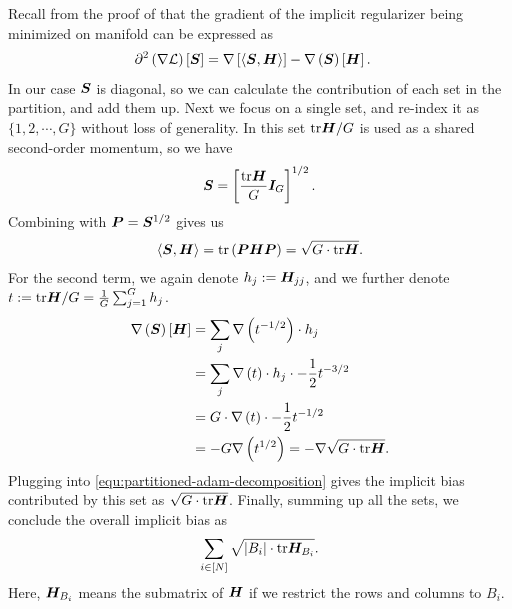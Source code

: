 Recall from the proof of  that the gradient of the implicit regularizer being minimized on manifold can be expressed as
\begin{align}
    \partial^2 \left(\nabla\mathcal{L}\right) \left[{\bm{S}}\right] &= \nabla\left[\langle {\bm{S}}, {\bm{H}}\rangle\right] - \nabla \left({\bm{S}}\right)\left[{\bm{H}}\right].\label{equ:partitioned-adam-decomposition}
\end{align}
In our case ${\bm{S}}$ is diagonal, so we can calculate the contribution of each set in the partition, and add them up. Next we focus on a single set, and re-index it as $\{1, 2, \cdots, G\}$ without loss of generality. In this set $\text{tr} {\bm{H}} / G$ is used as a shared second-order momentum, so we have \begin{align*}
    {\bm{S}} = \left[ \frac{\text{tr} {\bm{H}}}{G} {\bm{I}}_{G}\right]^{1/2}.
\end{align*}
Combining with ${\bm{P}} = {\bm{S}}^{1/2}$ gives us
\begin{align*}
    \langle {\bm{S}}, {\bm{H}}\rangle = \text{tr}\left({\bm{P}}{\bm{H}}{\bm{P}}\right) = \sqrt{G \cdot \text{tr} {\bm{H}}}.
\end{align*}
For the second term, we again denote $h_j:= {\bm{H}}_{jj}$, and we further denote $t:= \text{tr} {\bm{H}} / G = \frac{1}{G}\sum_{j = 1}^{G} h_j$. \begin{align*}
    \nabla \left({\bm{S}}\right)\left[{\bm{H}}\right] 
    &= \sum_j\nabla\left(t^{-1/2}\right) \cdot h_j \\
    &= \sum_j \nabla\left(t\right)\cdot h_j \cdot -\frac{1}{2} t^{-3/2} \\
    &= G \cdot \nabla\left(t\right) \cdot -\frac{1}{2} t^{-1/2}\\
    &= -G \nabla\left(t^{1/2}\right) = -\nabla \sqrt{G \cdot \text{tr} {\bm{H}}}.
\end{align*}
Plugging into \eqref{equ:partitioned-adam-decomposition} gives the implicit bias contributed by this set as $\sqrt{G \cdot \text{tr} {\bm{H}}}$. Finally, summing up all the sets, we conclude the overall implicit bias as \begin{align*}
    \sum_{i \in [N]} \sqrt{|B_i| \cdot \text{tr} {\bm{H}}_{B_i}}.
\end{align*} 
Here, ${\bm{H}}_{B_i}$ means the submatrix of ${\bm{H}}$ if we restrict the rows and columns to $B_i$.

